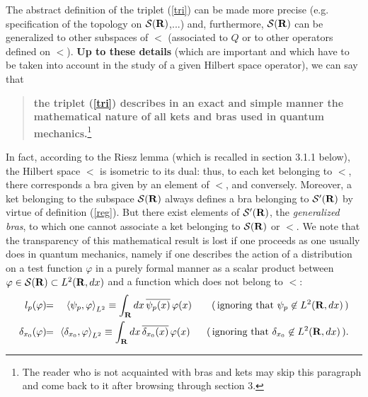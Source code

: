 \documentclass[a4wide,12pt]{report}
\begin{document}
The abstract definition of the triplet (\ref{tri}) 
can be made more precise (e.g. specification of the 
topology on ${\cal S}({\bf R})$,...) and,  
furthermore, ${\cal S}({\bf R})$ can be generalized to other 
subspaces of $\lt$ 
(associated to $Q$ or to other operators defined on 
$\lt$). 
{\bf Up to these details} (which are important and 
which have to be taken 
into account in the study of 
a given Hilbert space operator), 
we can say that
\begin{quote}
{\bf the triplet (\ref{tri})
describes in an exact and simple manner the mathematical nature 
of all kets and bras used 
in quantum mechanics.}\footnote{The reader who is not acquainted 
with bras and kets may skip this paragraph 
and come back to it after browsing through section 3.}  
\end{quote}
   In fact, according to the Riesz lemma (which is 
recalled in section 3.1.1 below), 
the Hilbert space $\lt$ is isometric  
to its dual: thus, to each ket 
belonging to $\lt$, there corresponds a bra 
given by an element of $\lt$,
and conversely. 
Moreover, a ket belonging to the subspace ${\cal S}({\bf R})$ always defines a bra
belonging to ${\cal S}^{\prime} ({\bf R})$ by virtue of definition (\ref{reg}).
But there exist elements of ${\cal S}^{\prime} ({\bf R})$, the {\em generalized bras}, 
to which one cannot associate a ket belonging to ${\cal S}({\bf R})$ or $\lt$.
We note that the transparency of this mathematical result 
is lost if one proceeds as one 
usually does in quantum mechanics, namely if one 
describes the action 
of a distribution on a test function $\varphi$ in a purely formal 
manner as a scalar product between 
$\varphi \in {\cal S}({\bf R}) \subset {L^2 ({{\bf R}},dx)}$
and a function which does not belong to $\lt$:
\begin{eqnarray}
\nonumber 
l_p (\varphi ) 
\! & \! = \! & \! 
\left\langle \psi_p ,\varphi \right\rangle _{L^2}
\equiv \int_{\br} dx \, \overline{\psi_p (x)} \, \varphi (x)
\qquad (\, \mbox{ignoring that}\ \psi_p \not \in \lt \,)
\\
\label{ign}
\delta_{x_0} (\varphi )
\! & \! = \! & \! 
\left\langle \delta_{x_0} , \varphi \right\rangle _{L^2}
\equiv \int_{\br} dx \, \overline{\delta_{x_0} (x)} \, \varphi (x)
\quad
\ \ (\, \mbox{ignoring that}\ \delta_{x_0} \not \in \lt \,).
\end{eqnarray}
 
\end{document}
